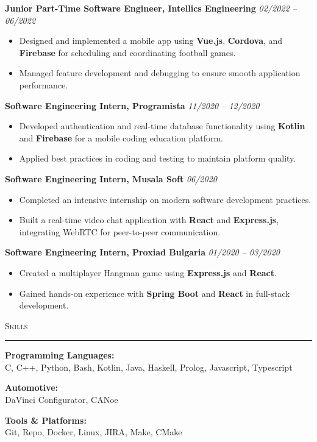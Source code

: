 \documentclass[a4paper,10pt]{article}
\newcommand{\textwithhr}[1]{
\textsc{#1}

\vspace{1mm}
\hrule \hfill
}
\begin{document}
\textbf{Junior Part-Time Software Engineer, Intellics Engineering} \hspace*{\fill} \textit{02/2022 -- 06/2022}
\begin{itemize}
    \item Designed and implemented a mobile app using \textbf{Vue.js}, \textbf{Cordova}, and \textbf{Firebase} for scheduling and coordinating football games.
    \item Managed feature development and debugging to ensure smooth application performance.
\end{itemize}

\textbf{Software Engineering Intern, Programista} \hspace*{\fill} \textit{11/2020 -- 12/2020}
\begin{itemize}
    \item Developed authentication and real-time database functionality using \textbf{Kotlin} and \textbf{Firebase} for a mobile coding education platform.
    \item Applied best practices in coding and testing to maintain platform quality.
\end{itemize}

\textbf{Software Engineering Intern, Musala Soft} \hspace*{\fill} \textit{06/2020}
\begin{itemize}
    \item Completed an intensive internship on modern software development practices.
    \item Built a real-time video chat application with \textbf{React} and \textbf{Express.js}, integrating WebRTC for peer-to-peer communication.
\end{itemize}

\textbf{Software Engineering Intern, Proxiad Bulgaria} \hspace*{\fill} \textit{01/2020 -- 03/2020}
\begin{itemize}
    \item Created a multiplayer Hangman game using \textbf{Express.js} and \textbf{React}.
    \item Gained hands-on experience with \textbf{Spring Boot} and \textbf{React} in full-stack development.
\end{itemize}

\textwithhr{Skills}

\begin{multicols}{2}
\noindent
\textbf{Programming Languages:} \\
C, C++, Python, Bash, Kotlin, Java, Haskell, Prolog, Javascript, Typescript

\vspace{3mm}
\textbf{Automotive:} \\
DaVinci Configurator, CANoe

\textbf{Tools \& Platforms:} \\
Git, Repo, Docker, Linux, JIRA, Make, CMake

\end{multicols}
\end{document}
